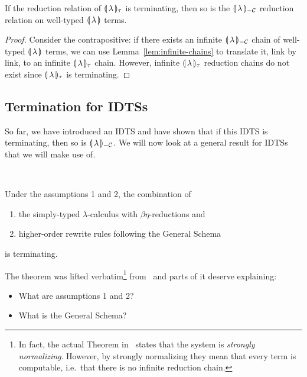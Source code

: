 \begin{lemma}\label{lem:banana-tau-termination}
  If the reduction relation of $\llparenthesis \, \lambda \, \rrparenthesis_\tau$ is terminating, then
  so is the ${\llparenthesis \, \lambda \, \rrparenthesis_{-\mathcal{C}}}$ reduction relation on well-typed ${\llparenthesis \, \lambda \, \rrparenthesis}$ terms.
\end{lemma}

\begin{proof}
  Consider the contrapositive: if there exists an infinite ${\llparenthesis \, \lambda \, \rrparenthesis_{-\mathcal{C}}}$
  chain of well-typed $\llparenthesis \, \lambda \, \rrparenthesis$ terms, we can use
  Lemma~\ref{lem:infinite-chains} to translate it, link by link, to an
  infinite $\llparenthesis \, \lambda \, \rrparenthesis_\tau$ chain. However, infinite
  $\llparenthesis \, \lambda \, \rrparenthesis_\tau$ reduction chains do not exist since
  $\llparenthesis \, \lambda \, \rrparenthesis_\tau$ is terminating.
\end{proof}


\subsection{Termination for IDTSs}
\label{ssec:termination-for-idts}

So far, we have introduced an IDTS and have shown that if this IDTS is
terminating, then so is ${\llparenthesis \, \lambda \, \rrparenthesis_{-\mathcal{C}}}$. We will now look at a general result
for IDTSs that we will make use of.

\begin{theorem}
  \label{thm:idts-normalization} ~\cite{blanqui2002inductive}

  Under the assumptions 1 and 2, the combination of

  \begin{enumerate}
  \item the simply-typed $\lambda$-calculus with $\beta\eta$-reductions and
  \item higher-order rewrite rules following the General Schema
  \end{enumerate}

  is terminating.
\end{theorem}

The theorem was lifted verbatim\footnote{In fact, the actual Theorem
  in~\cite{blanqui2002inductive} states that the system is \emph{strongly
    normalizing}. However, by strongly normalizing they mean that every
  term is computable, i.e.\ that there is no infinite reduction chain.}
from~\cite{blanqui2002inductive} and parts of it deserve explaining:

\begin{itemize}
\item What are assumptions 1 and 2?
\item What is the General Schema?
\end{itemize}

